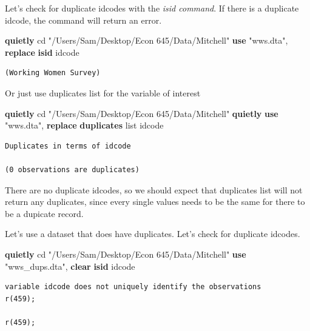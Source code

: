 \documentclass[
]{book}
\newenvironment{Shaded}{\begin{snugshade}}{\end{snugshade}}
\newcommand{\KeywordTok}[1]{\textcolor[rgb]{0.13,0.29,0.53}{\textbf{#1}}}
\newcommand{\NormalTok}[1]{#1}
\newcommand{\OtherTok}[1]{\textcolor[rgb]{0.56,0.35,0.01}{#1}}
\newcommand{\StringTok}[1]{\textcolor[rgb]{0.31,0.60,0.02}{#1}}
\begin{document}
Let's check for duplicate idcodes with the \emph{isid command}. If there is a duplicate idcode, the command will return an error.

\begin{Shaded}
\begin{Highlighting}[]
\KeywordTok{quietly}\NormalTok{ cd }\StringTok{"/Users/Sam/Desktop/Econ 645/Data/Mitchell"}
\KeywordTok{use} \StringTok{"wws.dta"}\NormalTok{, }\KeywordTok{replace}
\KeywordTok{isid}\NormalTok{ idcode}
\end{Highlighting}
\end{Shaded}

\begin{verbatim}
(Working Women Survey)
\end{verbatim}

Or just use duplicates list for the variable of interest

\begin{Shaded}
\begin{Highlighting}[]
\KeywordTok{quietly}\NormalTok{ cd }\StringTok{"/Users/Sam/Desktop/Econ 645/Data/Mitchell"}
\KeywordTok{quietly} \KeywordTok{use} \StringTok{"wws.dta"}\NormalTok{, }\KeywordTok{replace}
\KeywordTok{duplicates} \OtherTok{list}\NormalTok{ idcode}
\end{Highlighting}
\end{Shaded}

\begin{verbatim}
Duplicates in terms of idcode

(0 observations are duplicates)
\end{verbatim}

There are no duplicate idcodes, so we should expect that duplicates list will not return any duplicates, since every single values needs to be the same for there to be a dupicate record.

Let's use a dataset that does have duplicates. Let's check for duplicate idcodes.

\begin{Shaded}
\begin{Highlighting}[]
\KeywordTok{quietly}\NormalTok{ cd }\StringTok{"/Users/Sam/Desktop/Econ 645/Data/Mitchell"}
\KeywordTok{use} \StringTok{"wws\_dups.dta"}\NormalTok{, }\KeywordTok{clear}
\KeywordTok{isid}\NormalTok{ idcode}
\end{Highlighting}
\end{Shaded}

\begin{verbatim}
variable idcode does not uniquely identify the observations
r(459);

r(459);
\end{verbatim}
\end{document}
